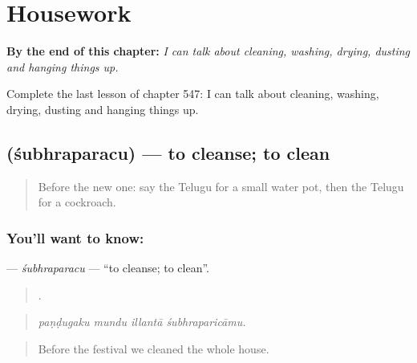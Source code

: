 
\chapter{Housework}
\label{ch:te-housework}

\begin{chapteropening}
\textbf{By the end of this chapter:} \emph{I can talk about cleaning, washing, drying, dusting and hanging things up.}

Complete the last lesson of chapter 547: I can talk about cleaning, washing, drying, dusting and hanging things up.
\end{chapteropening}

\section[\texorpdfstring{\te{శుభ్రపరచు} (śubhraparacu)}{శుభ్రపరచు (śubhraparacu)}]{ (śubhraparacu) — to cleanse; to clean}

\label{lesson:TE-C547-subhraparacu}



\begin{quote}
Before the new one: say the Telugu for a small water pot, then the Telugu for a cockroach.
\end{quote}

\subsection*{You'll want to know: }
\textbf{} — \emph{śubhraparacu} — \textquotedblleft{}to cleanse; to clean\textquotedblright{}.

\begin{quote}
   .
\end{quote}

\begin{quote}
\emph{paṇḍugaku mundu illantā śubhraparicāmu.}
\end{quote}

\begin{quote}
Before the festival we cleaned the whole house.
\end{quote}

